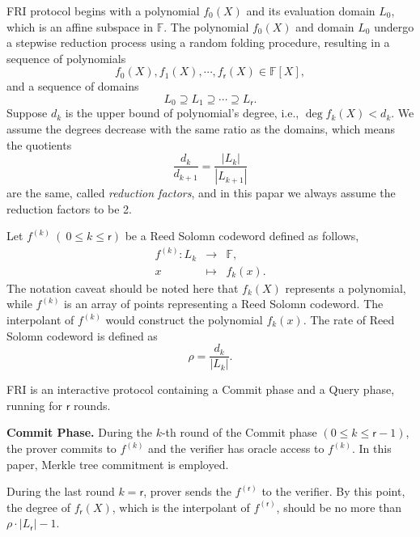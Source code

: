 FRI protocol begins with a polynomial $f_0(X)$ and its evaluation domain $L_0$, which is an affine subspace in $\mathbb{F}$.
The polynomial $f_0(X)$ and domain $L_0$ undergo a stepwise reduction process using a random folding procedure, resulting in a sequence of polynomials
\begin{equation}
	f_0(X), f_1(X),\cdots, f_{\mathsf{r}}(X)\in \mathbb{F}[X],
\end{equation}
and a sequence of domains
\begin{equation}
	L_0 \supseteq L_1 \supseteq \cdots \supseteq L_{\mathsf{r}}.
\end{equation}
Suppose $d_k$ is the upper bound of polynomial's degree, i.e., $\deg f_k(X) < d_k$. We assume the degrees decrease with the same ratio as the domains, which means the quotients
\begin{equation}
	\frac{d_k}{d_{k+1}} = \frac{|L_k|}{|L_{k+1}|}
\end{equation}
are the same, called \textit{reduction factors}, and in this papar we always assume the reduction factors to be 2.

Let $f^{(k)}\ (\ 0\le k \le \mathsf{r})$ be a Reed Solomn codeword defined as follows,
\begin{equation}
	\begin{aligned}
		f^{(k)}:L_k &\rightarrow &\mathbb{F},\\
		x &\mapsto& f_k(x).
	\end{aligned}
\end{equation}
The notation caveat should be noted here that $f_k(X)$ represents a polynomial, while $f^{(k)}$ is an array of points representing a Reed Solomn codeword. The interpolant of $f^{(k)}$ would construct the polynomial $f_k(x)$. The rate of Reed Solomn codeword is defined as
\begin{equation}
	\rho = \frac{d_k }{|L_{k}|}.
\end{equation}

FRI is an interactive protocol containing a Commit phase and a Query phase,  running for $\mathsf{r}$ rounds.
\newline

\noindent\textbf{Commit Phase.}
During the $k$-th round of the Commit phase $(0\le k \le \mathsf{r} - 1)$, the prover commits to $f^{(k)}$ and the verifier has oracle access to  $f^{(k)}$. In this paper, Merkle tree commitment is employed.

During the last round $k = \mathsf{r}$, prover sends the  $f^{(\mathsf{r})}$ to the verifier. By this point, the degree of $f_{\mathsf{r}}(X)$, which is the interpolant of  $f^{(\mathsf{r})}$, should be no more than $\rho\cdot |L_{\mathsf{r}}| -1$.
\newline

